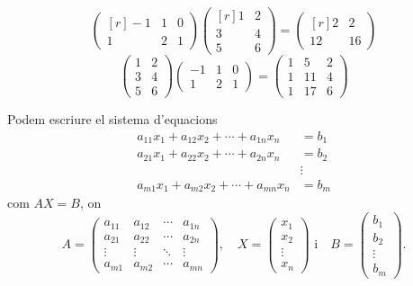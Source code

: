 \begin{exemple}\label{exempl:prodmat}
	$$
	\begin{pmatrix*}[r] -1 & 1 & 0 \\ 1 & 2 & 1 \end{pmatrix*}
	\begin{pmatrix*}[r] 1 & 2 \\ 3 & 4 \\ 5 & 6 \end{pmatrix*}
	= 	\begin{pmatrix*}[r] 2 & 2 \\ 12 & 16 \end{pmatrix*}
	$$
	$$
	\begin{pmatrix} 1 & 2 \\ 3 & 4 \\ 5 & 6 \end{pmatrix}
	\begin{pmatrix} -1 & 1 & 0 \\ 1 & 2 & 1 \end{pmatrix}
	= 	\begin{pmatrix} 1 & 5 & 2 \\ 1 & 11 & 4 \\ 1 & 17 & 6 \end{pmatrix}
	$$
\end{exemple}

\begin{exemple}
	Podem escriure el sistema d'equacions
	\begin{align*}
	a_{11}x_1+a_{12}x_2+ \cdots + a_{1n}x_n &= b_1 \\
	a_{21}x_1+a_{22}x_2+ \cdots + a_{2n}x_n &= b_2 \\
	&\vdots \\
	a_{m1}x_1+a_{m2}x_2+ \cdots + a_{mn}x_n &= b_m
	\end{align*}
	com $AX=B$, on
	\[
	A=
	\begin{pmatrix}
	a_{11} & a_{12} & \cdots & a_{1n} \\
	a_{21} & a_{22} & \cdots & a_{2n} \\
	\vdots & \vdots & \ddots & \vdots \\
	a_{m1} & a_{m2} & \cdots & a_{mn} 
	\end{pmatrix},\quad
	X=
	\begin{pmatrix}
	x_1 \\ x_2 \\ \vdots \\ x_n
	\end{pmatrix} \text{ i}\quad
	B=
	\begin{pmatrix}
	b_1 \\ b_2 \\ \vdots \\ b_m
	\end{pmatrix}.
	\]
\end{exemple}

